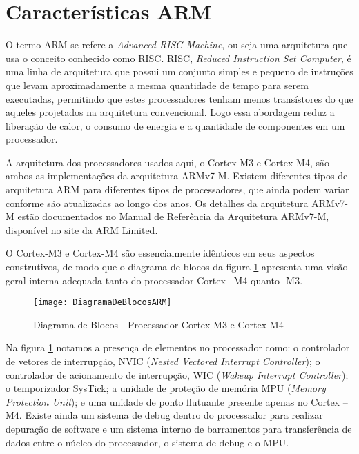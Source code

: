 \section{Características ARM}

O termo ARM se refere a \emph{Advanced RISC Machine}, ou seja uma arquitetura que usa o conceito conhecido como RISC. RISC, \emph{Reduced Instruction Set Computer}, é uma linha de arquitetura que possui um conjunto simples e pequeno de instruções que levam aproximadamente a mesma quantidade de tempo para serem executadas, permitindo que estes processadores tenham menos transístores do que aqueles projetados na arquitetura convencional. Logo essa abordagem reduz a liberação de calor, o consumo de energia e a quantidade de componentes em um processador.

A arquitetura dos processadores usados aqui, o Cortex-M3 e Cortex-M4, são ambos as implementações da arquitetura ARMv7-M. Existem diferentes tipos de arquitetura ARM para diferentes tipos de processadores, que ainda podem variar conforme são atualizadas ao longo dos anos. Os detalhes da arquitetura ARMv7-M estão documentados no Manual de Referência da Arquitetura  ARMv7-M, disponível no site da  \href{http://infocenter.arm.com/help/index.jsp}{ARM Limited}.

O Cortex-M3 e Cortex-M4 são essencialmente idênticos em seus aspectos construtivos, de modo que o diagrama de blocos da figura \ref{DiagramaDeBlocosARM}  apresenta uma visão  geral interna adequada tanto do processador Cortex –M4 quanto -M3.

\begin{figure}[h]
	\centering
	\texttt{[image: DiagramaDeBlocosARM]}
	\caption{Diagrama de Blocos - Processador Cortex-M3 e Cortex-M4 \cite{DATASHEET_TIVA}}
	\label{DiagramaDeBlocosARM}
\end{figure}

Na figura \ref{DiagramaDeBlocosARM} notamos a presença de elementos no processador como:  o controlador de vetores de interrupção, NVIC (\emph{Nested Vectored Interrupt Controller}); o controlador de acionamento de interrupção, WIC (\emph{Wakeup Interrupt Controller}); o temporizador SysTick; a unidade de proteção de memória MPU (\emph{Memory Protection Unit}); e uma unidade de ponto flutuante presente apenas no Cortex –M4. Existe ainda um sistema de debug dentro do processador para realizar depuração de software e um sistema interno de barramentos para transferência de dados entre o núcleo do processador, o sistema de debug e o MPU. 

